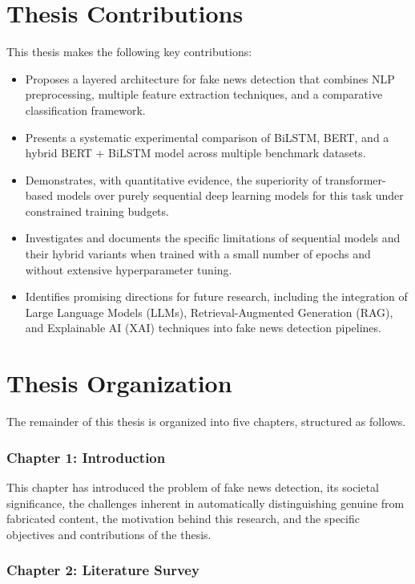 \section{Thesis Contributions}

This thesis makes the following key contributions:

\begin{itemize}
\item Proposes a layered architecture for fake news detection that combines NLP preprocessing, multiple feature extraction techniques, and a comparative classification framework.
\item Presents a systematic experimental comparison of BiLSTM, BERT, and a hybrid BERT + BiLSTM model across multiple benchmark datasets.
\item Demonstrates, with quantitative evidence, the superiority of transformer-based models over purely sequential deep learning models for this task under constrained training budgets.
\item Investigates and documents the specific limitations of sequential models and their hybrid variants when trained with a small number of epochs and without extensive hyperparameter tuning.
\item Identifies promising directions for future research, including the integration of Large Language Models (LLMs), Retrieval-Augmented Generation (RAG), and Explainable AI (XAI) techniques into fake news detection pipelines.
\end{itemize}

\section{Thesis Organization}

The remainder of this thesis is organized into five chapters, structured as follows.

\subsubsection*{Chapter 1: Introduction}

This chapter has introduced the problem of fake news detection, its societal significance, the challenges inherent in automatically distinguishing genuine from fabricated content, the motivation behind this research, and the specific objectives and contributions of the thesis.

\subsubsection*{Chapter 2: Literature Survey}

